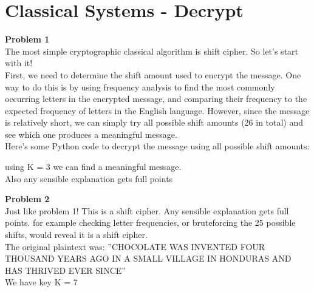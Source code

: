 \documentclass[a4paper, 11pt]{article}
\newenvironment{problem}[2][Problem]
    { \begin{mdframed}[backgroundcolor=gray!20] \textbf{#1 #2} \\}
    {  \end{mdframed}}
\begin{document}
\section*{Classical Systems - Decrypt}
\begin{problem}{1}
The most simple cryptographic classical algorithm is shift cipher. So let's start with it!\\
First, we need to determine the shift amount used to encrypt the message. One way to do this is by using frequency analysis to find the most commonly occurring letters in the encrypted message, and comparing their frequency to the expected frequency of letters in the English language. However, since the message is relatively short, we can simply try all possible shift amounts (26 in total) and see which one produces a meaningful message.\\
Here's some Python code to decrypt the message using all possible shift amounts:

using K = 3 we can find a meaningful message.\\
Also any sensible explanation gets full points
\end{problem}
\begin{problem}{2}
Just like problem 1! This is a shift cipher. Any sensible explanation gets full points.
for example checking letter frequencies, or bruteforcing the 25 possible shifts,
would reveal it is a shift cipher.\\
The original plaintext was:
”CHOCOLATE WAS INVENTED FOUR THOUSAND YEARS AGO IN A
SMALL VILLAGE IN HONDURAS AND HAS THRIVED EVER SINCE”\\
We have key K = 7

\end{problem}
\end{document}
